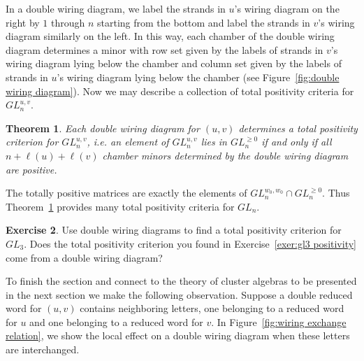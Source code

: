 \documentclass{amsart}
\newtheorem{theorem}{Theorem}[section]
\theoremstyle{definition}
\newtheorem{exercise}[theorem]{Exercise}
\theoremstyle{remark}
\numberwithin{equation}{section}
\begin{document}
    In a double wiring diagram, we label the strands in $u$'s wiring diagram on the right by $1$ through $n$ starting from the bottom and label the strands in $v$'s wiring diagram similarly on the left.  In this way, each chamber of the double wiring diagram determines a minor with row set given by the labels of strands in $v$'s wiring diagram lying below the chamber and column set given by the labels of strands in $u$'s wiring diagram lying below the chamber (see Figure~\ref{fig:double wiring diagram}).  Now we may describe a collection of total positivity criteria for $GL_n^{u,v}$.
    \setcounter{subtheorem}{3}
    \begin{theorem}\label{th:total positivity criteria}\cite{FZ99}
      Each double wiring diagram for $(u,v)$ determines a total positivity criterion for $GL_n^{u,v}$, i.e. an element of $GL_n^{u,v}$ lies in $GL_n^{\ge0}$ if and only if all $n+\ell(u)+\ell(v)$ chamber minors determined by the double wiring diagram are positive.
    \end{theorem}
    The totally positive matrices are exactly the elements of $GL_n^{w_0,w_0}\cap GL_n^{\ge0}$.  Thus Theorem~\ref{th:total positivity criteria} provides many total positivity criteria for $GL_n$.
    \setcounter{subexercise}{4}
    \begin{exercise}
      Use double wiring diagrams to find a total positivity criterion for $GL_3$.  Does the total positivity criterion you found in Exercise~\ref{exer:gl3 positivity} come from a double wiring diagram?
    \end{exercise}
    To finish the section and connect to the theory of cluster algebras to be presented in the next section we make the following observation.  Suppose a double reduced word for $(u,v)$ contains neighboring letters, one belonging to a reduced word for $u$ and one belonging to a reduced word for $v$.  In Figure~\ref{fig:wiring exchange relation}, we show the local effect on a double wiring diagram when these letters are interchanged. 
\end{document}

